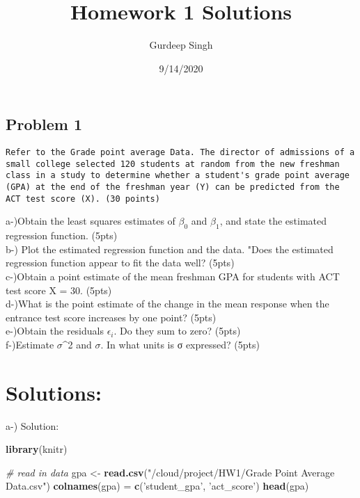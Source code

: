 \documentclass[
]{article}
\title{Homework 1 Solutions}
\author{Gurdeep Singh}
\date{9/14/2020}
\newenvironment{Shaded}{\begin{snugshade}}{\end{snugshade}}
\newcommand{\CommentTok}[1]{\textcolor[rgb]{0.56,0.35,0.01}{\textit{#1}}}
\newcommand{\KeywordTok}[1]{\textcolor[rgb]{0.13,0.29,0.53}{\textbf{#1}}}
\newcommand{\NormalTok}[1]{#1}
\newcommand{\StringTok}[1]{\textcolor[rgb]{0.31,0.60,0.02}{#1}}
\begin{document}
\maketitle

\hypertarget{problem-1}{%
\subsection{Problem 1}\label{problem-1}}

\begin{verbatim}
Refer to the Grade point average Data. The director of admissions of a small college selected 120 students at random from the new freshman class in a study to determine whether a student's grade point average (GPA) at the end of the freshman year (Y) can be predicted from the ACT test score (X). (30 points)
\end{verbatim}

a-)Obtain the least squares estimates of \(\beta_{0}\) and
\(\beta_{1}\), and state the estimated regression function. (5pts)\\
b-) Plot the estimated regression function and the data. "Does the
estimated regression function appear to fit the data well? (5pts)\\
c-)Obtain a point estimate of the mean freshman GPA for students with
ACT test score X = 30. (5pts)\\
d-)What is the point estimate of the change in the mean response when
the entrance test score increases by one point? (5pts)\\
e-)Obtain the residuals \(\epsilon_{i}\). Do they sum to zero? (5pts)\\
f-)Estimate \(\sigma\)\^{}2 and \(\sigma\). In what units is σ
expressed? (5pts)\\

\hypertarget{solutions}{%
\section{Solutions:}\label{solutions}}

a-) Solution:

\begin{Shaded}
\begin{Highlighting}[]
\KeywordTok{library}\NormalTok{(knitr)}

\CommentTok{# read in data}
\NormalTok{gpa <-}\StringTok{ }\KeywordTok{read.csv}\NormalTok{(}\StringTok{"/cloud/project/HW1/Grade Point Average Data.csv"}\NormalTok{)}
\KeywordTok{colnames}\NormalTok{(gpa) =}\StringTok{ }\KeywordTok{c}\NormalTok{(}\StringTok{'student_gpa'}\NormalTok{, }\StringTok{'act_score'}\NormalTok{)}
\KeywordTok{head}\NormalTok{(gpa)}
\end{Highlighting}
\end{Shaded}
\end{document}
